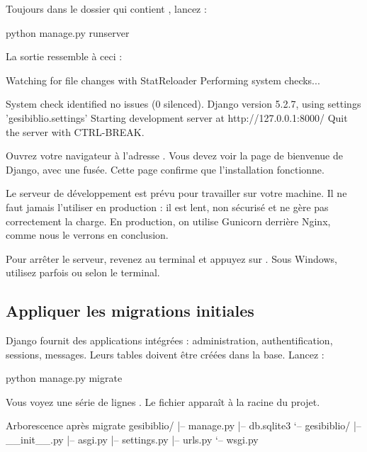 Toujours dans le dossier qui contient , lancez :

\begin{terminal}
python manage.py runserver
\end{terminal}

La sortie ressemble à ceci :

\begin{terminal}
Watching for file changes with StatReloader
Performing system checks...

System check identified no issues (0 silenced).
Django version 5.2.7, using settings 'gesibiblio.settings'
Starting development server at http://127.0.0.1:8000/
Quit the server with CTRL-BREAK.
\end{terminal}

Ouvrez votre navigateur à l'adresse . Vous devez voir
la page de bienvenue de Django, avec une fusée. Cette page confirme que
l'installation fonctionne.

\begin{attention}
Le serveur de développement est prévu pour travailler sur votre machine. Il ne faut
jamais l'utiliser en production : il est lent, non sécurisé et ne gère pas
correctement la charge. En production, on utilise Gunicorn derrière Nginx, comme
nous le verrons en conclusion.
\end{attention}

Pour arrêter le serveur, revenez au terminal et appuyez sur . Sous
Windows, utilisez parfois  ou  selon le terminal.

\subsection{Appliquer les migrations initiales}

Django fournit des applications intégrées : administration, authentification,
sessions, messages. Leurs tables doivent être créées dans la base. Lancez :

\begin{terminal}
python manage.py migrate
\end{terminal}

Vous voyez une série de lignes . Le fichier
 apparaît à la racine du projet.

\begin{codebox}[tree]{Arborescence après migrate}
gesibiblio/
|-- manage.py
|-- db.sqlite3
`-- gesibiblio/
    |-- __init__.py
    |-- asgi.py
    |-- settings.py
    |-- urls.py
    `-- wsgi.py
\end{codebox}

